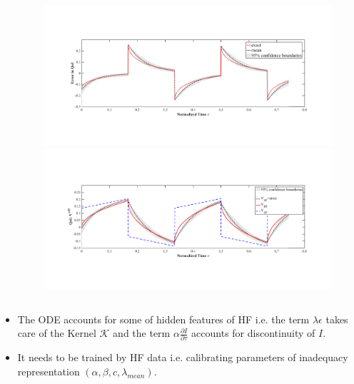 \documentclass[10pt,xcolor=dvipsnames,compress]{beamer}
\begin{document}
\begin{frame}
\begin{columns}
\begin{column}{.42\textwidth}
\end{column}
\begin{column}{.59\textwidth}
\begin{center}
\begin{figure}[h]
    \centering
    \includegraphics[trim = 1.3in 2.2in 1.6in 2.8in, clip, width=1\textwidth]{figs/error_bound.png} 
        \\
    \includegraphics[trim = 1.3in 2.2in 1.6in 2.8in, clip, width=1\textwidth]{figs/V_bound.png} 
\end{figure}
\end{center}
\end{column}
\end{columns}
\begin{block}{}
\begin{itemize}
\item The ODE accounts for some of hidden features of HF i.e. 
the term $\lambda\epsilon$ takes care of the Kernel $\mathcal{K}$ and
the term $\alpha \frac{\partial I}{\partial\tau}$ accounts for discontinuity of $I$.
\item It needs to be trained by HF data i.e. calibrating parameters of inadequacy representation $(\alpha, \beta, c, \lambda_{mean})$. 
\end{itemize}
\end{block}


\vfill
\end{frame}
\end{document}
